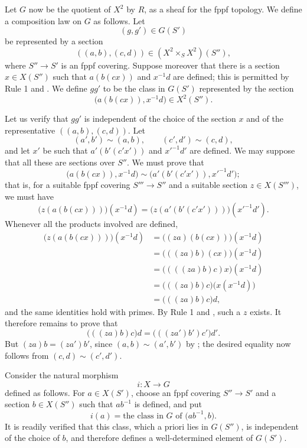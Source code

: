 Let \(G\) now be the quotient of \(X^2\) by \(R\), as a sheaf for
the fppf topology. We define a composition law on \(G\) as
follows. Let
\[
  (g,g')\in G(S')
\]
be represented by a section
\[
  ((a,b),(c,d))\in (X^2\times_S X^2)(S''),
\]
where \(S''\to S'\) is an fppf covering. Suppose moreover that
there is a section \(x\in X(S'')\) such that \(a(b(cx))\) and
\(x^{-1}d\) are defined; this is permitted by Rule 1 and . We
define \(gg'\) to be the class in \(G(S')\) represented by the
section
\[
  \bigl(a(b(cx)),x^{-1}d\bigr)\in X^2(S'').
\]

Let us verify that \(gg'\) is independent of the choice of the
section \(x\) and of the representative
\(((a,b),(c,d))\). Let
\[
  (a',b')\sim(a,b),\qquad (c',d')\sim(c,d),
\]
and let \(x'\) be such that \(a'(b'(c'x'))\) and
\({x'}^{-1}d'\) are defined. We may suppose that all these are
sections over \(S''\). We must prove that
\[
  \bigl(a(b(cx)),x^{-1}d\bigr)
  \sim
  \bigl(a'(b'(c'x')),{x'}^{-1}d'\bigr);
\]
that is, for a suitable fppf covering \(S'''\to S''\) and a
suitable section \(z\in X(S''')\), we must have
\[
 \bigl(z(a(b(cx)))\bigr)(x^{-1}d)
 =
 \bigl(z(a'(b'(c'x')))\bigr)({x'}^{-1}d').
\]
Whenever all the products involved are defined,
\[
\begin{aligned}
 \bigl(z(a(b(cx)))\bigr)(x^{-1}d)
 &=\bigl((za)(b(cx))\bigr)(x^{-1}d)\\
 &=\bigl(((za)b)(cx)\bigr)(x^{-1}d)\\
 &=\bigl((((za)b)c)x\bigr)(x^{-1}d)\\
 &=\bigl(((za)b)c\bigr)\bigl(x(x^{-1}d)\bigr)\\
 &=\bigl(((za)b)c\bigr)d,
\end{aligned}
\]
and the same identities hold with primes. By Rule 1 and ,
such a \(z\) exists. It therefore remains to prove that
\[
  \bigl(((za)b)c\bigr)d
  =
  \bigl(((za')b')c'\bigr)d'.
\]
But \((za)b=(za')b'\), since
\((a,b)\sim(a',b')\) by ; the desired equality now follows
from \((c,d)\sim(c',d')\).

Consider the natural morphism
\[
  i\colon X\longrightarrow G
\]
defined as follows. For \(a\in X(S')\), choose an fppf covering
\(S''\to S'\) and a section \(b\in X(S'')\) such that
\(ab^{-1}\) is defined, and put
\[
  i(a)=\text{the class in \(G\) of }\bigl(ab^{-1},b\bigr).
\]
It is readily verified that this class, which a priori lies in
\(G(S'')\), is independent of the choice of \(b\), and therefore
defines a well-determined element of \(G(S')\).

